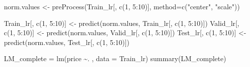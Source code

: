 \documentclass[
]{article}
\newenvironment{Shaded}{\begin{snugshade}}{\end{snugshade}}
\newcommand{\AttributeTok}[1]{\textcolor[rgb]{0.77,0.63,0.00}{#1}}
\newcommand{\DecValTok}[1]{\textcolor[rgb]{0.00,0.00,0.81}{#1}}
\newcommand{\FunctionTok}[1]{\textcolor[rgb]{0.00,0.00,0.00}{#1}}
\newcommand{\NormalTok}[1]{#1}
\newcommand{\OtherTok}[1]{\textcolor[rgb]{0.56,0.35,0.01}{#1}}
\newcommand{\SpecialCharTok}[1]{\textcolor[rgb]{0.00,0.00,0.00}{#1}}
\newcommand{\StringTok}[1]{\textcolor[rgb]{0.31,0.60,0.02}{#1}}
\begin{document}
\begin{Shaded}
\begin{Highlighting}[]
\NormalTok{norm.values }\OtherTok{\textless{}{-}} \FunctionTok{preProcess}\NormalTok{(Train\_lr[, }\FunctionTok{c}\NormalTok{(}\DecValTok{1}\NormalTok{, }\DecValTok{5}\SpecialCharTok{:}\DecValTok{10}\NormalTok{)], }\AttributeTok{method=}\FunctionTok{c}\NormalTok{(}\StringTok{"center"}\NormalTok{, }\StringTok{"scale"}\NormalTok{))}

\NormalTok{Train\_lr[, }\FunctionTok{c}\NormalTok{(}\DecValTok{1}\NormalTok{, }\DecValTok{5}\SpecialCharTok{:}\DecValTok{10}\NormalTok{)] }\OtherTok{\textless{}{-}} \FunctionTok{predict}\NormalTok{(norm.values, Train\_lr[, }\FunctionTok{c}\NormalTok{(}\DecValTok{1}\NormalTok{, }\DecValTok{5}\SpecialCharTok{:}\DecValTok{10}\NormalTok{)])}
\NormalTok{Valid\_lr[, }\FunctionTok{c}\NormalTok{(}\DecValTok{1}\NormalTok{, }\DecValTok{5}\SpecialCharTok{:}\DecValTok{10}\NormalTok{)] }\OtherTok{\textless{}{-}} \FunctionTok{predict}\NormalTok{(norm.values, Valid\_lr[, }\FunctionTok{c}\NormalTok{(}\DecValTok{1}\NormalTok{, }\DecValTok{5}\SpecialCharTok{:}\DecValTok{10}\NormalTok{)])}
\NormalTok{ Test\_lr[, }\FunctionTok{c}\NormalTok{(}\DecValTok{1}\NormalTok{, }\DecValTok{5}\SpecialCharTok{:}\DecValTok{10}\NormalTok{)] }\OtherTok{\textless{}{-}} \FunctionTok{predict}\NormalTok{(norm.values,  Test\_lr[, }\FunctionTok{c}\NormalTok{(}\DecValTok{1}\NormalTok{, }\DecValTok{5}\SpecialCharTok{:}\DecValTok{10}\NormalTok{)])}
\end{Highlighting}
\end{Shaded}

\begin{Shaded}
\begin{Highlighting}[]
\NormalTok{LM\_complete }\OtherTok{=} \FunctionTok{lm}\NormalTok{(price }\SpecialCharTok{\textasciitilde{}}\NormalTok{. , }\AttributeTok{data =}\NormalTok{ Train\_lr)}
\FunctionTok{summary}\NormalTok{(LM\_complete)}
\end{Highlighting}
\end{Shaded}
\end{document}
